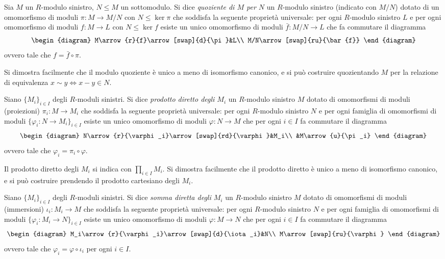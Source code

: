 \begin{definition}
Sia $M$ un $R$-modulo sinistro, $N\le M$ un sottomodulo. Si dice \emph{quoziente di $M$ per $N$} un $R$-modulo sinistro (indicato con $M/N$) dotato di un omomorfismo di moduli $\pi:M\to M/N$ con $N\le\ker\pi$ che soddisfa la seguente proprietà universale: per ogni $R$-modulo sinistro $L$ e per ogni omomorfismo di moduli $f:M\to L$ con $N\le\ker f$ esiste un unico omomorfismo di moduli $\bar{f}:M/N\to L$ che fa commutare il diagramma
$$
\begin{diagram}
M\arrow{r}{f}\arrow[swap]{d}{\pi}&L\\
M/N\arrow[swap]{ru}{\bar{f}}
\end{diagram}
$$
ovvero tale che $f=\bar{f}\circ\pi$.
\end{definition}

Si dimostra facilmente che il modulo quoziente è unico a meno di isomorfismo canonico, e si può costruire quozientando $M$ per la relazione di equivalenza $x\sim y\iff x-y\in N$.

\begin{definition}
Siano $\{M_i\}_{i\in I}$ degli $R$-moduli sinistri. Si dice \emph{prodotto diretto degli $M_i$} un $R$-modulo sinistro $M$ dotato di omomorfismi di moduli (proiezioni) $\pi_i:M\to M_i$ che soddisfa la seguente proprietà universale: per ogni $R$-modulo sinistro $N$ e per ogni famiglia di omomorfismi di moduli $\{\varphi_i:N\to M_i\}_{i\in I}$ esiste un unico omomorfismo di moduli $\varphi:N\to M$ che per ogni $i\in I$ fa commutare il diagramma
$$
\begin{diagram}
N\arrow{r}{\varphi_i}\arrow[swap]{rd}{\varphi}&M_i\\
&M\arrow{u}{\pi_i}
\end{diagram}
$$
ovvero tale che $\varphi_i=\pi_i\circ\varphi$.
\end{definition}

Il prodotto diretto degli $M_i$ si indica con $\prod_{i\in I}M_i$. Si dimostra facilmente che il prodotto diretto è unico a meno di isomorfismo canonico, e si può costruire prendendo il prodotto cartesiano degli $M_i$.


\begin{definition}
Siano $\{M_i\}_{i\in I}$ degli $R$-moduli sinistri. Si dice \emph{somma diretta degli $M_i$} un $R$-modulo sinistro $M$ dotato di omomorfismi di moduli (immersioni) $\iota_i:M_i\to M$ che soddisfa la seguente proprietà universale: per ogni $R$-modulo sinistro $N$ e per ogni famiglia di omomorfismi di moduli $\{\varphi_i:M_i\to N\}_{i\in I}$ esiste un unico omomorfismo di moduli $\varphi:M\to N$ che per ogni $i\in I$ fa commutare il diagramma
$$
\begin{diagram}
M_i\arrow{r}{\varphi_i}\arrow[swap]{d}{\iota_i}&N\\
M\arrow[swap]{ru}{\varphi}
\end{diagram}
$$
ovvero tale che $\varphi_i=\varphi\circ\iota_i$ per ogni $i\in I$.
\end{definition}

